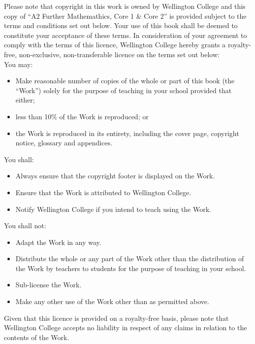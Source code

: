 \documentclass[class=exam, crop=false, 12pt]{standalone}
\begin{document}
\noindent Please note that copyright in this work is owned by Wellington College and this copy of ``A2 Further Mathemathics, Core 1 \& Core 2''  is provided subject to the terms and conditions set out below. Your use of this book shall be deemed to constitute your acceptance of these terms. In consideration of your agreement to comply with the terms of this licence, Wellington College hereby grants a royalty-free, non-exclusive, non-transferable licence on the terms set out below:\\You may:
\begin{itemize}
\item Make reasonable number of copies of the whole or part of this book (the ``Work'') solely for the purpose of teaching in your school provided that either;\item less than 10\% of the Work is reproduced; or\item the Work is reproduced in its entirety, including the cover page, copyright notice, glossary and appendices.
\end{itemize}You shall:
\begin{itemize}\item Always ensure that the copyright footer is displayed on the Work.\item Ensure that the Work is attributed to Wellington College.\item Notify Wellington College if you intend to teach using the Work.
\end{itemize}You shall not:
\begin{itemize}\item Adapt the Work in any way. \item Distribute the whole or any part of the Work other than the distribution of the Work by teachers to students for the purpose of teaching in your school.\item Sub-license the Work.\item Make any other use of the Work other than as permitted above.\end{itemize}Given that this licence is provided on a royalty-free basis, please note that Wellington College accepts no liability in respect of any claims in relation to the contents of the Work.\\
\end{document}
